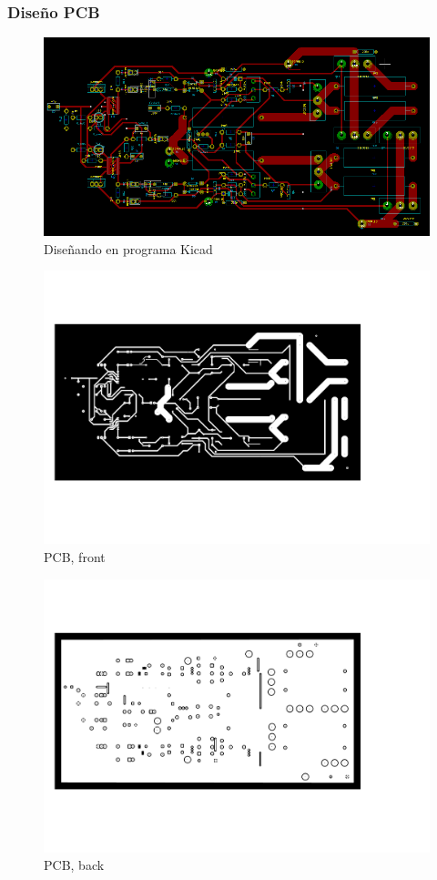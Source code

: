 \documentclass[a4paper,12pt,twoside]{article}
\begin{document}
\newpage
\subsubsection{Diseño PCB}

\begin{figure}[H]
    \centering
    \includegraphics[height=0.4\textwidth]{img/PCB/PCB_kicad}
    \caption{Diseñando en programa Kicad}
    \label{fig:pcb1}
\end{figure}

\begin{figure}[H]
    \centering
    \includegraphics[height=0.7\textwidth]{img/PCB/amplificador-F.pdf}
    \caption{PCB, front}
    \label{fig:pcb2}
\end{figure}

\begin{figure}[H]
    \centering
    \includegraphics[height=0.7\textwidth]{img/PCB/amplificador-B.pdf}
    \caption{PCB, back}
    \label{fig:pcb3}
\end{figure}
\end{document}
